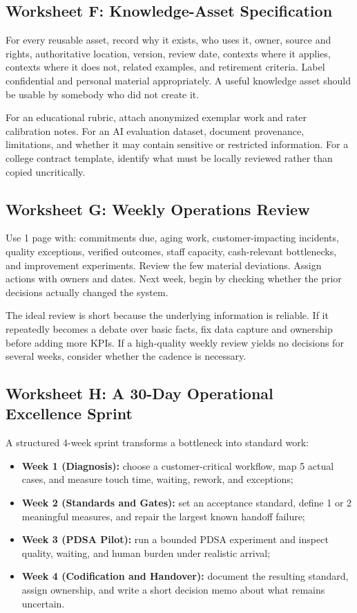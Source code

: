 \subsection{Worksheet F: Knowledge-Asset Specification}
\label{sec:worksheet_f_knowledge_asset}

For every reusable asset, record why it exists, who uses it, owner, source and rights, authoritative location, version, review date, contexts where it applies, contexts where it does not, related examples, and retirement criteria. Label confidential and personal material appropriately. A useful knowledge asset should be usable by somebody who did not create it.

For an educational rubric, attach anonymized exemplar work and rater calibration notes. For an AI evaluation dataset, document provenance, limitations, and whether it may contain sensitive or restricted information. For a college contract template, identify what must be locally reviewed rather than copied uncritically.

\subsection{Worksheet G: Weekly Operations Review}
\label{sec:worksheet_g_weekly_review}

Use 1 page with: commitments due, aging work, customer-impacting incidents, quality exceptions, verified outcomes, staff capacity, cash-relevant bottlenecks, and improvement experiments. Review the few material deviations. Assign actions with owners and dates. Next week, begin by checking whether the prior decisions actually changed the system.

The ideal review is short because the underlying information is reliable. If it repeatedly becomes a debate over basic facts, fix data capture and ownership before adding more KPIs. If a high-quality weekly review yields no decisions for several weeks, consider whether the cadence is necessary.

\subsection{Worksheet H: A 30-Day Operational Excellence Sprint}
\label{sec:worksheet_h_30_day_sprint}

A structured 4-week sprint transforms a bottleneck into standard work:
\begin{itemize}
    \item \textbf{Week 1 (Diagnosis):} choose a customer-critical workflow, map 5 actual cases, and measure touch time, waiting, rework, and exceptions;
    \item \textbf{Week 2 (Standards and Gates):} set an acceptance standard, define 1 or 2 meaningful measures, and repair the largest known handoff failure;
    \item \textbf{Week 3 (PDSA Pilot):} run a bounded PDSA experiment and inspect quality, waiting, and human burden under realistic arrival;
    \item \textbf{Week 4 (Codification and Handover):} document the resulting standard, assign ownership, and write a short decision memo about what remains uncertain.
\end{itemize}

